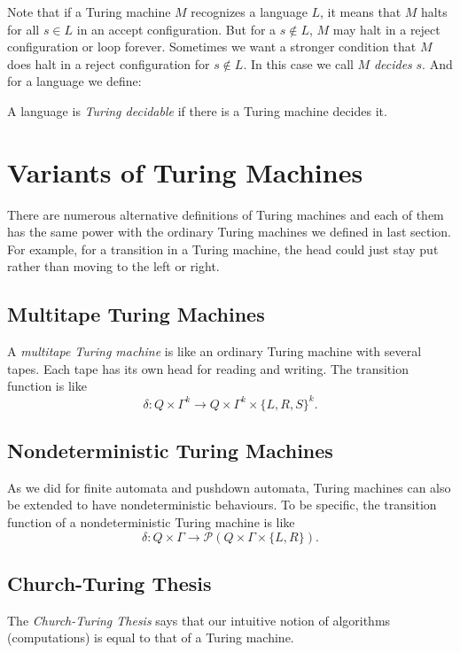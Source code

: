 \documentclass[11pt]{article}
\begin{document}
Note that if a Turing machine $M$ recognizes a language $L$, it means that $M$ halts for all
$s \in L$ in an accept configuration. But for a $s \not\in L$, $M$ may halt in a reject
configuration or loop forever. Sometimes we want a stronger condition that $M$ does halt in a reject
configuration for $s \not\in L$. In this case we call $M$ \emph{decides} $s$. And for a language we
define:

\begin{definition}
A language is \emph{Turing decidable} if there is a Turing machine decides it.
\end{definition}

\section{Variants of Turing Machines}

There are numerous alternative definitions of Turing machines and each of them has the same power
with the ordinary Turing machines we defined in last section. For example, for a transition in a
Turing machine, the head could just stay put rather than moving to the left or right.

\subsection{Multitape Turing Machines}

A \emph{multitape Turing machine} is like an ordinary Turing machine with several tapes. Each tape
has its own head for reading and writing. The transition function is like
\[
  \delta: Q \times \Gamma^k \rightarrow Q \times \Gamma^k \times \{L,R,S\}^k.
\]

\subsection{Nondeterministic Turing Machines}

As we did for finite automata and pushdown automata, Turing machines can also be extended to have
nondeterministic behaviours. To be specific, the transition function of a nondeterministic Turing
machine is like
\[
  \delta: Q \times \Gamma \rightarrow \mathcal{P}(Q \times \Gamma \times \{L,R\}).
\]

\subsection{Church-Turing Thesis}

The \emph{Church-Turing Thesis} says that our intuitive notion of algorithms (computations) is equal
to that of a Turing machine.
\end{document}

